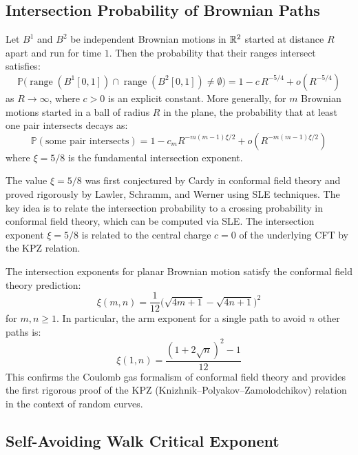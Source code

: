 \subsection{Intersection Probability of Brownian Paths}

\begin{theorem}
Let $B^1$ and $B^2$ be independent Brownian motions in $\mathbb{R}^2$ started at distance $R$ apart and run for time $1$. Then the probability that their ranges intersect satisfies:
\[
\mathbb{P}\bigl(\operatorname{range}(B^1[0,1]) \cap \operatorname{range}(B^2[0,1]) \neq \emptyset\bigr) = 1 - c \, R^{-5/4} + o(R^{-5/4})
\]
as $R \to \infty$, where $c > 0$ is an explicit constant. More generally, for $m$ Brownian motions started in a ball of radius $R$ in the plane, the probability that at least one pair intersects decays as:
\[
\mathbb{P}(\text{some pair intersects}) = 1 - c_m R^{-m(m-1)\xi/2} + o(R^{-m(m-1)\xi/2})
\]
where $\xi = 5/8$ is the fundamental intersection exponent.
\end{theorem}

\begin{remark}
The value $\xi = 5/8$ was first conjectured by Cardy in conformal field theory and proved rigorously by Lawler, Schramm, and Werner using SLE techniques. The key idea is to relate the intersection probability to a crossing probability in conformal field theory, which can be computed via SLE. The intersection exponent $\xi = 5/8$ is related to the central charge $c = 0$ of the underlying CFT by the KPZ relation.
\end{remark}

\begin{theorem}
The intersection exponents for planar Brownian motion satisfy the conformal field theory prediction:
\[
\xi(m,n) = \frac{1}{12}\bigl(\sqrt{4m+1} - \sqrt{4n+1}\bigr)^2
\]
for $m,n \geq 1$. In particular, the arm exponent for a single path to avoid $n$ other paths is:
\[
\xi(1,n) = \frac{(1 + 2\sqrt{n})^2 - 1}{12}
\]
This confirms the Coulomb gas formalism of conformal field theory and provides the first rigorous proof of the KPZ (Knizhnik--Polyakov--Zamolodchikov) relation in the context of random curves.
\end{theorem}

\subsection{Self-Avoiding Walk Critical Exponent}

